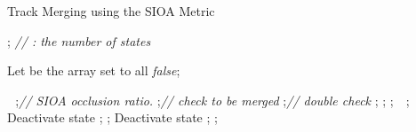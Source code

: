 \documentclass[journal]{IEEEtran}
\newcounter{ct}
\begin{document}
\begin{algorithm}[t]
  \footnotesize
   \caption{Track Merging using the SIOA Metric}
   \label{algo:merge}
      
      
    \begin{algorithmic}[1]
        \State ; \hfill \textit{//  : the number of states }
        
        \State Let  be the array set to all \textit{false};
        
        \,\,
                \State ;\hfill \textit{// SIOA occlusion ratio.}
                \If{}
                    \State ;\hfill \textit{// check to be merged}
                    \State ;\hfill \textit{// double check}
                    \State ;
                    \If{}
                        \State ;
                    \Else
                        \State ;
                    \EndIf
                \EndIf
            \EndFor
        \EndFor
        \,\,
                \If {}
                    \If {}
                        \State ;
                        \State Deactivate state ;
                    \Else
                        \State ;
                        \State Deactivate state ;
                    \EndIf
                \EndIf
            \EndFor
        \EndFor
        \State \Return ;
       \EndFunction

\end{algorithmic}
\end{algorithm}
\end{document}
